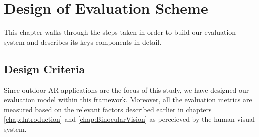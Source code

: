 \chapter{Design of Evaluation Scheme}
\label{chap:System}

This chapter walks through the steps taken in order to build our evaluation system and describes its keys components in detail.

\section{Design Criteria}

Since outdoor AR applications are the focus of this study, we have designed our evaluation model within this framework. Moreover, all the evaluation
metrics are measured based on the relevant factors described earlier in chapters \ref{chap:Introduction} and \ref{chap:BinocularVision} as perceieved
by the human visual system.







